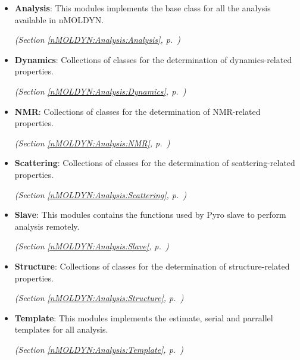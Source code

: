 \begin{itemize}
\setlength{\parskip}{0ex}
\item \textbf{Analysis}: This modules implements the base class for all the analysis available in 
nMOLDYN.



  \textit{(Section \ref{nMOLDYN:Analysis:Analysis}, p.~\pageref{nMOLDYN:Analysis:Analysis})}

\item \textbf{Dynamics}: Collections of classes for the determination of dynamics-related properties.



  \textit{(Section \ref{nMOLDYN:Analysis:Dynamics}, p.~\pageref{nMOLDYN:Analysis:Dynamics})}

\item \textbf{NMR}: Collections of classes for the determination of NMR-related properties.



  \textit{(Section \ref{nMOLDYN:Analysis:NMR}, p.~\pageref{nMOLDYN:Analysis:NMR})}

\item \textbf{Scattering}: Collections of classes for the determination of scattering-related properties.



  \textit{(Section \ref{nMOLDYN:Analysis:Scattering}, p.~\pageref{nMOLDYN:Analysis:Scattering})}

\item \textbf{Slave}: This modules contains the functions used by Pyro slave to perform analysis remotely.



  \textit{(Section \ref{nMOLDYN:Analysis:Slave}, p.~\pageref{nMOLDYN:Analysis:Slave})}

\item \textbf{Structure}: Collections of classes for the determination of structure-related properties.



  \textit{(Section \ref{nMOLDYN:Analysis:Structure}, p.~\pageref{nMOLDYN:Analysis:Structure})}

\item \textbf{Template}: This modules implements the estimate, serial and parrallel templates for 
all analysis.



  \textit{(Section \ref{nMOLDYN:Analysis:Template}, p.~\pageref{nMOLDYN:Analysis:Template})}

\end{itemize}

